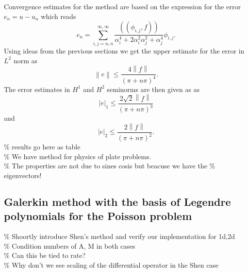 \documentclass[a4paper,10pt]{article}
\newcommand{\norm}[1]{\ensuremath{\left\|#1\right\|}}
\newcommand{\seminorm}[1]{\ensuremath{\left|#1\right|}}
\newcommand{\Inner}[2]{\ensuremath{\left(\left(#1, #2\right)\right)}}
\begin{document}
  Convergence estimates for the method are based on the expression for the error
  $e_n=u-u_n$ which reads
  \[
    e_n = \sum\limits_{i, j = n, n}^{\infty, \infty} \frac{\Inner{\phi_{i,
    j}}{f}}{\alpha_i^4 + 2\alpha_i^2\alpha_j^2 + \alpha_j^4}\phi_{i, j}.
  \]
  Using ideas from the previous sections we get the upper estimate for the error
  in $L^2$ norm
  as
  \[
    \norm{e} \leq \frac{4\norm{f}}{\left(\pi + n\pi \right)^4}.
  \]
  The error estimates in $H^1$ and $H^2$ seminorms are then given as 
  as
  \[
    \seminorm{e}_1 \leq \frac{2\sqrt{2}\norm{f}}{\left(\pi + n\pi \right)^3}
  \]
  and
  \[
    \seminorm{e}_2 \leq \frac{2\norm{f}}{\left(\pi + n\pi \right)^2}.
  \]
  \% results go here as table\\
  \% We have method for physics of plate problems.\\
  \% The properties are not due to sines cosis but beacuse we have the
  \% eigenvectors!\\
  \subsection{Galerkin method with the basis of Legendre polynomials for the
  Poisson problem}
  \% Shoortly introduce Shen's method and verify our implementation for 1d,2d\\
  \% Condition numbers of A, M in both cases\\
  \% Can this be tied to rate?\\
  \% Why don't we see scaling of the differential operator in the Shen case\\

 
\end{document}
